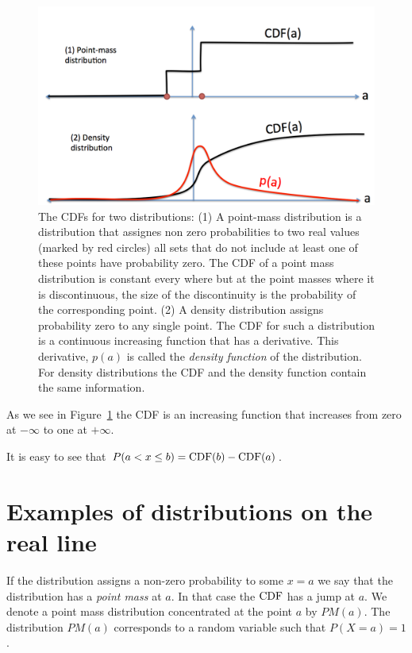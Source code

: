 \documentclass{report}
\theoremstyle{plain}
\theoremstyle{definition}
\begin{document}
\begin{figure}[h]
\begin{center}
\includegraphics[width=5in]{figs/CDFs.png}
\end{center}
\caption{The CDFs for two distributions: (1) A point-mass distribution
  is a distribution that assignes non zero probabilities to two real
  values (marked by red circles) all sets that do not include at least
  one of these points have probability zero. The CDF of a point mass
  distribution is constant every where but at the point masses where
  it is discontinuous, the size of the discontinuity is the
  probability of the corresponding point. (2) A density distribution
  assigns probability zero to any single point. The CDF for such a
  distribution is a continuous increasing function that has a
  derivative. This derivative, $p(a)$ is called the {\em density function} of
  the distribution. For density distributions the CDF and the density
  function contain the same information.\label{fig:CDF}}
\end{figure}

As we see in Figure~\ref{fig:CDF} the CDF is an increasing function that
increases from zero at $-\infty$ to one at $+\infty$.

It is easy to see that $P(a<x\leq b)=\mbox{CDF}(b)-\mbox{CDF}(a)$.


\section{Examples of distributions on the real line}
If the distribution assigns a non-zero probability to some $x=a$ we
say that the distribution has a {\em point mass} at $a$. In that case
the $\mbox{CDF}$ has a jump at $a$. We denote a point mass distribution
concentrated at the point $a$ by $PM(a)$. The distribution $PM(a)$
corresponds to a random variable such that $P(X=a)=1$.
\end{document}
